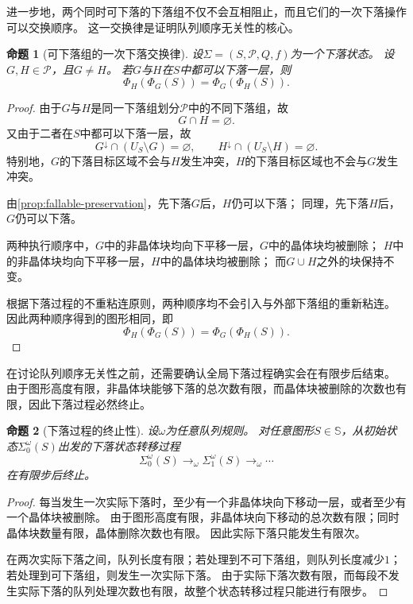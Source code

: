 \documentclass[UTF8,fontset=none]{ctexart}
\theoremstyle{cnthm}
\newtheorem{proposition}{命题}[section]
\begin{document}
			进一步地，两个同时可下落的下落组不仅不会互相阻止，而且它们的一次下落操作可以交换顺序。
			这一交换律是证明队列顺序无关性的核心。
			
			\begin{proposition}[可下落组的一次下落交换律]\label{prop:fall-commutation}
				设$\Sigma=(S,\mathcal{P},Q,f)$为一个下落状态。
				设$G,H\in\mathcal{P}$，且$G\neq H$。
				若$G$与$H$在$S$中都可以下落一层，则
				$$
				\Phi_H(\Phi_G(S))
				=
				\Phi_G(\Phi_H(S)).
				$$
			\end{proposition}
			
			\begin{proof}
				由于$G$与$H$是同一下落组划分$\mathcal{P}$中的不同下落组，故
				$$
				G\cap H=\varnothing.
				$$
				又由于二者在$S$中都可以下落一层，故
				$$
				G^\downarrow\cap(U_S\setminus G)=\varnothing,
				\qquad
				H^\downarrow\cap(U_S\setminus H)=\varnothing.
				$$
				特别地，$G$的下落目标区域不会与$H$发生冲突，$H$的下落目标区域也不会与$G$发生冲突。
				
				由\cref{prop:fallable-preservation}，先下落$G$后，$H$仍可以下落；
				同理，先下落$H$后，$G$仍可以下落。
				
				两种执行顺序中，$G$中的非晶体块均向下平移一层，$G$中的晶体块均被删除；
				$H$中的非晶体块均向下平移一层，$H$中的晶体块均被删除；
				而$G\cup H$之外的块保持不变。
				
				根据下落过程的不重粘连原则，两种顺序均不会引入与外部下落组的重新粘连。
				因此两种顺序得到的图形相同，即
				$$
				\Phi_H(\Phi_G(S))
				=
				\Phi_G(\Phi_H(S)).
				$$
			\end{proof}
			
			在讨论队列顺序无关性之前，还需要确认全局下落过程确实会在有限步后结束。
			由于图形高度有限，非晶体块能够下落的总次数有限，而晶体块被删除的次数也有限，因此下落过程必然终止。
			
			\begin{proposition}[下落过程的终止性]\label{prop:fall-termination}
				设$\omega$为任意队列规则。
				对任意图形$S\in\mathbb{S}$，从初始状态$\Sigma_0^\omega(S)$出发的下落状态转移过程
				$$
				\Sigma_0^\omega(S)
				\longrightarrow_\omega
				\Sigma_1^\omega(S)
				\longrightarrow_\omega
				\cdots
				$$
				在有限步后终止。
			\end{proposition}
			
			\begin{proof}
				每当发生一次实际下落时，至少有一个非晶体块向下移动一层，或者至少有一个晶体块被删除。
				由于图形高度有限，非晶体块向下移动的总次数有限；同时晶体块数量有限，晶体删除次数也有限。
				因此实际下落只能发生有限次。
				
				在两次实际下落之间，队列长度有限；若处理到不可下落组，则队列长度减少$1$；若处理到可下落组，则发生一次实际下落。
				由于实际下落次数有限，而每段不发生实际下落的队列处理次数也有限，故整个状态转移过程只能进行有限步。
			\end{proof}
			
\end{document}
